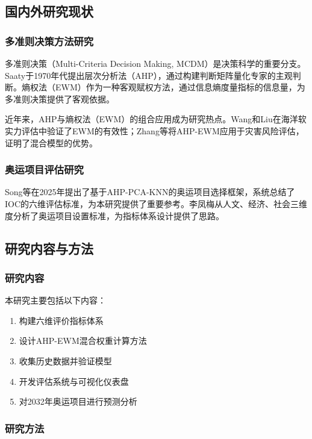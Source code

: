 \subsection{国内外研究现状}

\subsubsection{多准则决策方法研究}

多准则决策（Multi-Criteria Decision Making, MCDM）是决策科学的重要分支。Saaty\cite{saaty2007analytic}于1970年代提出层次分析法（AHP），通过构建判断矩阵量化专家的主观判断。熵权法（EWM）作为一种客观赋权方法，通过信息熵度量指标的信息量，为多准则决策提供了客观依据。

近年来，AHP与熵权法（EWM）的组合应用成为研究热点。Wang和Liu\cite{wang2019comprehensive}在海洋软实力评估中验证了EWM的有效性；Zhang等\cite{zhang2023risk}将AHP-EWM应用于灾害风险评估，证明了混合模型的优势。

\subsubsection{奥运项目评估研究}

Song等\cite{song2025quantifying}在2025年提出了基于AHP-PCA-KNN的奥运项目选择框架，系统总结了IOC的六维评估标准，为本研究提供了重要参考。李凤梅\cite{li2013xiaji}从人文、经济、社会三维度分析了奥运项目设置标准，为指标体系设计提供了思路。

\subsection{研究内容与方法}

\subsubsection{研究内容}

本研究主要包括以下内容：
\begin{enumerate}
\item 构建六维评价指标体系
\item 设计AHP-EWM混合权重计算方法
\item 收集历史数据并验证模型
\item 开发评估系统与可视化仪表盘
\item 对2032年奥运项目进行预测分析
\end{enumerate}

\subsubsection{研究方法}


